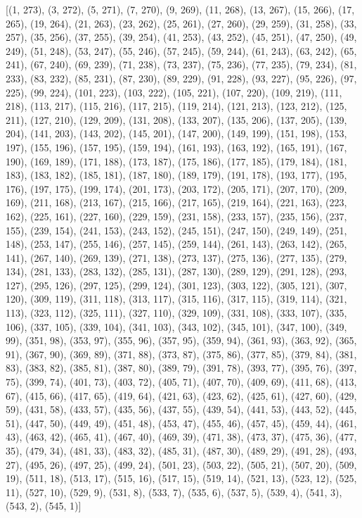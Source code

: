 \documentclass[10pt, letterpaper, titlepage]{article}
\newcommand{\0}{\varnothing}
\newcommand{\1}{\{ 1 \}}
\newcommand{\2}{\{ (1,1) \}}
\begin{document}
            [(1, 273), (3, 272), (5, 271), (7, 270), (9, 269), (11, 268), (13, 267), (15, 266), (17, 265), (19, 264), (21, 263), (23, 262), (25, 261), (27, 260), (29, 259), (31, 258), (33, 257), (35, 256), (37, 255), (39, 254), (41, 253), (43, 252), (45, 251), (47, 250), (49, 249), (51, 248), (53, 247), (55, 246), (57, 245), (59, 244), (61, 243), (63, 242), (65, 241), (67, 240), (69, 239), (71, 238), (73, 237), (75, 236), (77, 235), (79, 234), (81, 233), (83, 232), (85, 231), (87, 230), (89, 229), (91, 228), (93, 227), (95, 226), (97, 225), (99, 224), (101, 223), (103, 222), (105, 221), (107, 220), (109, 219), (111, 218), (113, 217), (115, 216), (117, 215), (119, 214), (121, 213), (123, 212), (125, 211), (127, 210), (129, 209), (131, 208), (133, 207), (135, 206), (137, 205), (139, 204), (141, 203), (143, 202), (145, 201), (147, 200), (149, 199), (151, 198), (153, 197), (155, 196), (157, 195), (159, 194), (161, 193), (163, 192), (165, 191), (167, 190), (169, 189), (171, 188), (173, 187), (175, 186), (177, 185), (179, 184), (181, 183), (183, 182), (185, 181), (187, 180), (189, 179), (191, 178), (193, 177), (195, 176), (197, 175), (199, 174), (201, 173), (203, 172), (205, 171), (207, 170), (209, 169), (211, 168), (213, 167), (215, 166), (217, 165), (219, 164), (221, 163), (223, 162), (225, 161), (227, 160), (229, 159), (231, 158), (233, 157), (235, 156), (237, 155), (239, 154), (241, 153), (243, 152), (245, 151), (247, 150), (249, 149), (251, 148), (253, 147), (255, 146), (257, 145), (259, 144), (261, 143), (263, 142), (265, 141), (267, 140), (269, 139), (271, 138), (273, 137), (275, 136), (277, 135), (279, 134), (281, 133), (283, 132), (285, 131), (287, 130), (289, 129), (291, 128), (293, 127), (295, 126), (297, 125), (299, 124), (301, 123), (303, 122), (305, 121), (307, 120), (309, 119), (311, 118), (313, 117), (315, 116), (317, 115), (319, 114), (321, 113), (323, 112), (325, 111), (327, 110), (329, 109), (331, 108), (333, 107), (335, 106), (337, 105), (339, 104), (341, 103), (343, 102), (345, 101), (347, 100), (349, 99), (351, 98), (353, 97), (355, 96), (357, 95), (359, 94), (361, 93), (363, 92), (365, 91), (367, 90), (369, 89), (371, 88), (373, 87), (375, 86), (377, 85), (379, 84), (381, 83), (383, 82), (385, 81), (387, 80), (389, 79), (391, 78), (393, 77), (395, 76), (397, 75), (399, 74), (401, 73), (403, 72), (405, 71), (407, 70), (409, 69), (411, 68), (413, 67), (415, 66), (417, 65), (419, 64), (421, 63), (423, 62), (425, 61), (427, 60), (429, 59), (431, 58), (433, 57), (435, 56), (437, 55), (439, 54), (441, 53), (443, 52), (445, 51), (447, 50), (449, 49), (451, 48), (453, 47), (455, 46), (457, 45), (459, 44), (461, 43), (463, 42), (465, 41), (467, 40), (469, 39), (471, 38), (473, 37), (475, 36), (477, 35), (479, 34), (481, 33), (483, 32), (485, 31), (487, 30), (489, 29), (491, 28), (493, 27), (495, 26), (497, 25), (499, 24), (501, 23), (503, 22), (505, 21), (507, 20), (509, 19), (511, 18), (513, 17), (515, 16), (517, 15), (519, 14), (521, 13), (523, 12), (525, 11), (527, 10), (529, 9), (531, 8), (533, 7), (535, 6), (537, 5), (539, 4), (541, 3), (543, 2), (545, 1)]
\end{document}
